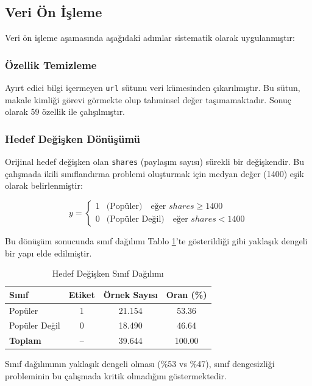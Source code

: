 \documentclass[conference]{IEEEtran}
\begin{document}
\subsection{Veri Ön İşleme}

Veri ön işleme aşamasında aşağıdaki adımlar sistematik olarak uygulanmıştır:

\subsubsection{Özellik Temizleme}
Ayırt edici bilgi içermeyen \texttt{url} sütunu veri kümesinden çıkarılmıştır. Bu sütun, makale kimliği görevi görmekte olup tahminsel değer taşımamaktadır. Sonuç olarak 59 özellik ile çalışılmıştır.

\subsubsection{Hedef Değişken Dönüşümü}
Orijinal hedef değişken olan \texttt{shares} (paylaşım sayısı) sürekli bir değişkendir. Bu çalışmada ikili sınıflandırma problemi oluşturmak için medyan değer (1400) eşik olarak belirlenmiştir:

\begin{equation}
    y = \begin{cases} 
    1 & \text{(Popüler)} \quad \text{eğer } shares \geq 1400 \\
    0 & \text{(Popüler Değil)} \quad \text{eğer } shares < 1400
    \end{cases}
\end{equation}

Bu dönüşüm sonucunda sınıf dağılımı Tablo \ref{tab:class_dist}'te gösterildiği gibi yaklaşık dengeli bir yapı elde edilmiştir.

\begin{table}[H]
\centering
\caption{Hedef Değişken Sınıf Dağılımı}
\label{tab:class_dist}
\begin{tabular}{lccc}
\toprule
\textbf{Sınıf} & \textbf{Etiket} & \textbf{Örnek Sayısı} & \textbf{Oran (\%)} \\
\midrule
Popüler & 1 & 21.154 & 53.36 \\
Popüler Değil & 0 & 18.490 & 46.64 \\
\midrule
\textbf{Toplam} & -- & 39.644 & 100.00 \\
\bottomrule
\end{tabular}
\end{table}

Sınıf dağılımının yaklaşık dengeli olması (\%53 vs \%47), sınıf dengesizliği probleminin bu çalışmada kritik olmadığını göstermektedir.
\end{document}
